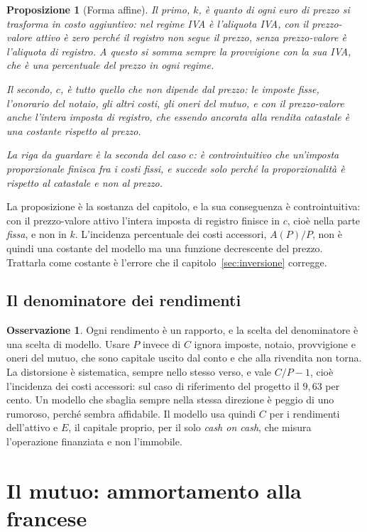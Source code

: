 \documentclass[11pt,a4paper]{article}
\theoremstyle{definition}
\newtheorem{osservazione}[definizione]{Osservazione}
\theoremstyle{plain}
\newtheorem{proposizione}[definizione]{Proposizione}
\begin{document}
\begin{proposizione}[Forma affine]
Il primo, $k$, è quanto di ogni euro di prezzo si trasforma in costo aggiuntivo: nel regime IVA è l'aliquota IVA, con il prezzo-valore attivo è zero perché il registro non segue il prezzo, senza prezzo-valore è l'aliquota di registro. A questo si somma sempre la provvigione con la sua IVA, che è una percentuale del prezzo in ogni regime.

Il secondo, $c$, è tutto quello che non dipende dal prezzo: le imposte fisse, l'onorario del notaio, gli altri costi, gli oneri del mutuo, e con il prezzo-valore anche l'intera imposta di registro, che essendo ancorata alla rendita catastale è una costante rispetto al prezzo.

La riga da guardare è la seconda del caso $c$: è controintuitivo che un'imposta proporzionale finisca fra i costi fissi, e succede solo perché la proporzionalità è rispetto al catastale e non al prezzo.
\end{proposizione}

La proposizione è la sostanza del capitolo, e la sua conseguenza è controintuitiva: con il prezzo-valore attivo l'intera imposta di registro finisce in $c$, cioè nella parte \emph{fissa}, e non in $k$. L'incidenza percentuale dei costi accessori, $A(P)/P$, non è quindi una costante del modello ma una funzione decrescente del prezzo. Trattarla come costante è l'errore che il capitolo~\ref{sec:inversione} corregge.

\subsection{Il denominatore dei rendimenti}

\begin{osservazione}
Ogni rendimento è un rapporto, e la scelta del denominatore è una scelta di modello. Usare $P$ invece di $C$ ignora imposte, notaio, provvigione e oneri del mutuo, che sono capitale uscito dal conto e che alla rivendita non torna. La distorsione è sistematica, sempre nello stesso verso, e vale $C/P - 1$, cioè l'incidenza dei costi accessori: sul caso di riferimento del progetto il $9{,}63$ per cento. Un modello che sbaglia sempre nella stessa direzione è peggio di uno rumoroso, perché sembra affidabile. Il modello usa quindi $C$ per i rendimenti dell'attivo e $E$, il capitale proprio, per il solo \emph{cash on cash}, che misura l'operazione finanziata e non l'immobile.
\end{osservazione}

\section{Il mutuo: ammortamento alla francese}
\end{document}
